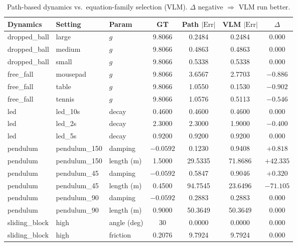 \begin{table}[t]
\centering
\caption{Path-based dynamics vs.\ equation-family selection (VLM). $\Delta$ negative $\Rightarrow$ VLM run better.}
\label{tab:equation_family}
\begin{tabular}{@{}lllS[table-format=2.4]S[table-format=2.4]S[table-format=2.4]S[table-format=-2.4]@{}}
\toprule
\textbf{Dynamics} & \textbf{Setting} & \textbf{Param} & {GT} & {Path $|\mathrm{Err}|$} & {VLM $|\mathrm{Err}|$} & {$\Delta$} \\
\midrule
dropped\_ball & large  & $g$ & 9.8066 & 0.2484 & 0.2484 & 0.000 \\
dropped\_ball & medium & $g$ & 9.8066 & 0.4863 & 0.4863 & 0.000 \\
dropped\_ball & small  & $g$ & 9.8066 & 0.5338 & 0.5338 & 0.000 \\
free\_fall    & mousepad & $g$ & 9.8066 & 3.6567 & 2.7703 & $-0.886$ \\
free\_fall    & table  & $g$ & 9.8066 & 1.0550 & 0.1530 & $-0.902$ \\
free\_fall    & tennis & $g$ & 9.8066 & 1.0576 & 0.5113 & $-0.546$ \\
led          & led\_10s & decay & 0.4600 & 0.4600 & 0.4600 & 0.000 \\
led          & led\_2s & decay & 2.3000 & 2.3000 & 1.9000 & $-0.400$ \\
led          & led\_5s & decay & 0.9200 & 0.9200 & 0.9200 & 0.000 \\
pendulum     & pendulum\_150 & damping & $-0.0592$ & 0.1230 & 0.9408 & $+0.818$ \\
pendulum     & pendulum\_150 & length (m) & 1.5000 & 29.5335 & 71.8686 & $+42.335$ \\
pendulum     & pendulum\_45 & damping & $-0.0592$ & 0.5847 & 0.9046 & $+0.320$ \\
pendulum     & pendulum\_45 & length (m) & 0.4500 & 94.7545 & 23.6496 & $-71.105$ \\
pendulum     & pendulum\_90 & damping & $-0.0592$ & 0.2883 & 0.2883 & 0.000 \\
pendulum     & pendulum\_90 & length (m) & 0.9000 & 50.3649 & 50.3649 & 0.000 \\
sliding\_block & high  & angle (deg) & 30 & 0.0000 & 0.0000 & 0.000 \\
sliding\_block & high  & friction & 0.2076 & 9.7924 & 9.7924 & 0.000 \\

\end{tabular}
\end{table}
